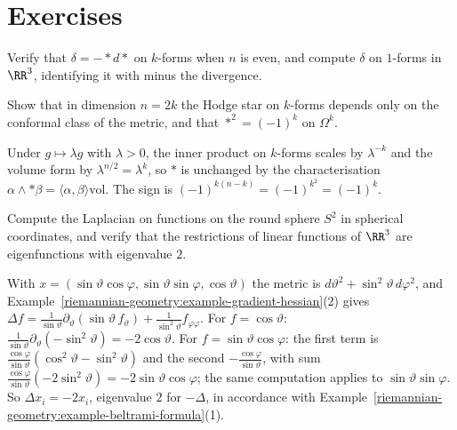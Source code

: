 \section{Exercises}\label{riemannian-geometry:section-exercises}

\begin{exercise}\label{riemannian-geometry:exercise-hodge-star-signs}
Verify that $\delta = -*d*$ on $k$-forms when $n$ is even, and compute $\delta$ on $1$-forms in $\RR^3$, identifying it with minus the divergence.
\end{exercise}

\begin{exercise}\label{riemannian-geometry:exercise-conformal}
Show that in dimension $n = 2k$ the Hodge star on $k$-forms depends only on the conformal class of the metric, and that $*^2 = (-1)^k$ on $\Omega^k$.
\end{exercise}

\begin{solution}
Under $g \mapsto \lambda g$ with $\lambda > 0$, the inner product on $k$-forms scales by $\lambda^{-k}$ and the volume form by $\lambda^{n/2} = \lambda^k$, so $*$ is unchanged by the characterisation
$\alpha \wedge *\beta = \langle\alpha,\beta\rangle\mathrm{vol}$. The sign is $(-1)^{k(n-k)} = (-1)^{k^2} = (-1)^k$.
\end{solution}

\begin{exercise}\label{riemannian-geometry:exercise-laplacian-sphere}
Compute the Laplacian on functions on the round sphere $S^2$ in spherical coordinates, and verify that the restrictions of linear functions of $\RR^3$ are eigenfunctions with eigenvalue $2$.
\end{exercise}

\begin{solution}
With $x = (\sin\vartheta\cos\varphi, \sin\vartheta\sin\varphi, \cos\vartheta)$ the metric is $d\vartheta^2 + \sin^2\vartheta\,d\varphi^2$, and Example~\ref{riemannian-geometry:example-gradient-hessian}(2) gives
$\Delta f = \frac{1}{\sin\vartheta}\partial_\vartheta(\sin\vartheta\,f_\vartheta) + \frac{1}{\sin^2\vartheta}f_{\varphi\varphi}$. For $f = \cos\vartheta$:
$\frac{1}{\sin\vartheta}\partial_\vartheta(-\sin^2\vartheta) = -2\cos\vartheta$. For $f = \sin\vartheta\cos\varphi$: the first term is
$\frac{\cos\varphi}{\sin\vartheta}(\cos^2\vartheta - \sin^2\vartheta)$ and the second $-\frac{\cos\varphi}{\sin\vartheta}$, with sum $\frac{\cos\varphi}{\sin\vartheta}(-2\sin^2\vartheta) = -2\sin\vartheta\cos\varphi$; the
same computation applies to $\sin\vartheta\sin\varphi$. So $\Delta x_i = -2x_i$, eigenvalue $2$ for $-\Delta$, in accordance with Example~\ref{riemannian-geometry:example-beltrami-formula}(1).
\end{solution}

